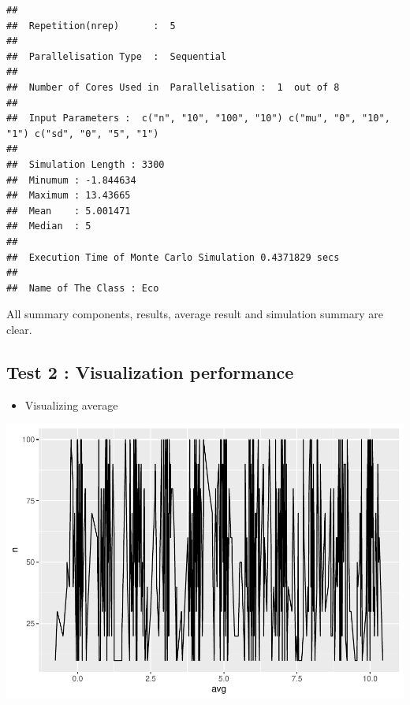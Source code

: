 \documentclass[11pt,a4paper]{article}
\newenvironment{Shaded}{\begin{snugshade}}{\end{snugshade}}
\newcommand{\AttributeTok}[1]{\textcolor[rgb]{0.77,0.63,0.00}{#1}}
\newcommand{\FunctionTok}[1]{\textcolor[rgb]{0.00,0.00,0.00}{#1}}
\newcommand{\NormalTok}[1]{#1}
\newcommand{\SpecialCharTok}[1]{\textcolor[rgb]{0.00,0.00,0.00}{#1}}
\begin{document}
\begin{verbatim}
## 
##  Repetition(nrep)      :  5 
## 
##  Parallelisation Type  :  Sequential 
## 
##  Number of Cores Used in  Parallelisation :  1  out of 8 
## 
##  Input Parameters :  c("n", "10", "100", "10") c("mu", "0", "10", "1") c("sd", "0", "5", "1") 
## 
##  Simulation Length : 3300 
##  Minumum : -1.844634 
##  Maximum : 13.43665 
##  Mean    : 5.001471 
##  Median  : 5 
## 
##  Execution Time of Monte Carlo Simulation 0.4371829 secs 
## 
##  Name of The Class : Eco
\end{verbatim}

All summary components, results, average result and simulation summary
are clear.

\hypertarget{test-2-visualization-performance}{%
\subsection{Test 2 : Visualization
performance}\label{test-2-visualization-performance}}

\begin{itemize}
  
\item
  Visualizing average
\end{itemize}

\begin{Shaded}
\end{Shaded}

\includegraphics{Abschlussarbeit_01_Sep_files/figure-latex/ggplot2-1.pdf}
\end{document}
